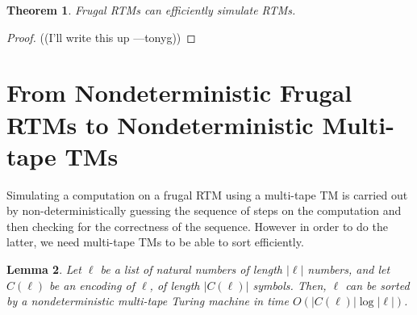 \documentclass[english]{article}
\theoremstyle{plain}
\newtheorem{thm}{Theorem}
\theoremstyle{definition}
\theoremstyle{plain}
\newtheorem{lem}[thm]{Lemma}
\begin{document}
\begin{thm}
  Frugal RTMs can efficiently simulate RTMs.
\end{thm}

\begin{proof}
  ((I'll write this up ---tonyg))
\end{proof}

\section{From Nondeterministic Frugal RTMs to Nondeterministic Multi-tape TMs}

Simulating a computation on a frugal RTM using a multi-tape TM is
carried out by non-deterministically guessing the sequence of steps on
the computation and then checking for the correctness of the
sequence. However in order to do the latter, we need multi-tape TMs to
be able to sort efficiently.

\begin{lem}
  Let $\ell$ be a list of natural numbers of length $|\ell|$ numbers,
  and let $C(\ell)$ be an encoding of $\ell$, of length $|C(\ell)|$
  symbols. Then, $\ell$ can be sorted by a nondeterministic multi-tape
  Turing machine in time $O(|C(\ell)|\log|\ell|)$.
\end{lem}
\end{document}
